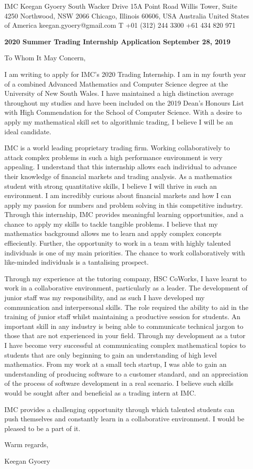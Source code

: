 \documentclass[a4paper,11pt]{article}
\begin{document}
IMC \hfill Keegan Gyoery  South Wacker Drive \hfill 15A Point Road \break
Willis Tower, Suite 4250 \hfill Northwood, NSW 2066 \break
Chicago, Illinois 60606, USA \hfill Australia \break
United States of America \hfill keegan.gyoery@gmail.com \break
T +01 (312) 244 3300 \hfill +61 434 820 971 \break

\vspace{5mm}
\textbf{2020 Summer Trading Internship Application September 28, 2019} \par
To Whom It May Concern, \par

I am writing to apply for IMC’s 2020 Trading Internship. I am in my fourth year of a
combined Advanced Mathematics and Computer Science degree at the University of New South
Wales. I have maintained a high distinction average throughout my studies and have been
included on the 2019 Dean’s Honours List with High Commendation for the School of Computer
Science. With a desire to apply my mathematical skill set to algorithmic trading, I believe I will
be an ideal candidate.\par

IMC is a world leading proprietary trading firm. Working collaboratively to attack complex problems in such a high performance environment is very appealing. I understand that this internship allows each individual to advance their knowledge of financial markets and trading analysis. As a mathematics student with strong quantitative skills, I believe I will thrive in such an environment. I am incredibly curious about financial markets and how I can apply my passion for numbers and problem solving in this competitive industry. Through this internship, IMC provides meaningful learning opportunities, and a chance to apply my skills to tackle tangible problems. I believe that my mathematics background allows me to learn and apply complex concepts effieciently. Further, the opportunity to work in a team with highly talented individuals is one of my main priorities. The chance to work collaboratively with like-minded individuals is a tantalising prospect.

Through my experience at the tutoring company, HSC CoWorks, I have learnt to work in a collaborative environment, particularly as a leader. The development of junior staff was my responsibility, and as such I have developed my communication and interpersonal skills. The role required the  ability to aid in the training of junior staff whilst maintaining a productive session for students. An important skill in any industry is being able to communicate technical jargon to those that are not experienced in your field. Through my development as a tutor I have become very successful at communicating complex mathematical topics to students that are only beginning to gain an understanding of high level mathematics. From my work at a small tech startup, I was able to gain an understanding of producing software to a customer standard, and an appreciation of the process of software development in a real scenario. I believe such skills would be sought after and beneficial as a trading intern at IMC.\par

IMC provides a challenging opportunity through which talented students can push themselves
and constantly learn in a collaborative environment. I would be pleased to be a part of it. \par

Warm regards, \par

Keegan Gyoery
\end{document}
